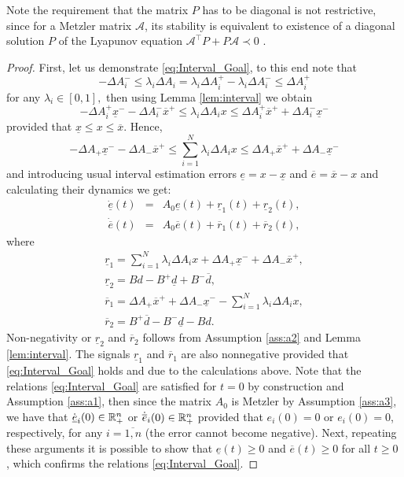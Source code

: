 \documentclass[twocolumn,english]{IEEEtran}
\theoremstyle{plain}
\theoremstyle{definition}
\theoremstyle{plain}
\theoremstyle{plain}
\theoremstyle{remark}
\begin{document}
Note the requirement that the matrix $P$ has to be diagonal is not restrictive, since for a Metzler matrix $\mathcal{A}$, its stability is equivalent to existence of a diagonal solution $P$ of the Lyapunov equation $\mathcal{A}^{\top}P+P\mathcal{A}\prec0$ \cite{FarinaRinaldi2000}.
\begin{proof}
First, let us demonstrate \eqref{eq:Interval_Goal}, to this end note that
\[
-\Delta A_{i}^{-}\leq\lambda_{i}\Delta A_{i}=\lambda_{i}\Delta A_{i}^{+}-\lambda_{i}\Delta A_{i}^{-}\leq\Delta A_{i}^{+}
\]
for any $\lambda_{i}\in[0,1],$ then using Lemma \ref{lem:interval} we obtain
\[
-\Delta A_{i}^{+}\underline{x}^{-}-\Delta A_{i}^{-}\overline{x}^{+}\leq\lambda_{i}\Delta A_{i}x\leq\Delta A_{i}^{+}\overline{x}^{+}+\Delta A_{i}^{-}\underline{x}^{-}
\]
provided that $\underline{x}\leq x\leq\overline{x}$. Hence,
\[
-\Delta A_{+}\underline{x}^{-}-\Delta A_{-}\overline{x}^{+}\leq\sum_{i=1}^{N}\lambda_{i}\Delta A_{i}x\leq\Delta A_{+}\overline{x}^{+}+\Delta A_{-}\underline{x}^{-}
\]
and introducing usual interval estimation errors $\underline{e}=x-\underline{x}$ and $\overline{e}=\overline{x}-x$ and calculating their dynamics we get:
\begin{eqnarray*}
\dot{\underline{e}}(t) & = & A_{0}\underline{e}(t)+\underline{r}_{1}(t)+\underline{r}_{2}(t),\\
\dot{\overline{e}}(t) & = & A_{0}\overline{e}(t)+\overline{r}_{1}(t)+\overline{r}_{2}(t),
\end{eqnarray*}
where
\begin{gather*}
\underline{r}_{1}=\sum_{i=1}^{N}\lambda_{i}\Delta A_{i}x+\Delta A_{+}\underline{x}^{-}+\Delta A_{-}\overline{x}^{+},\\
\underline{r}_{2}=Bd-B^{+}\underline{d}+B^{-}\overline{d},\\
\overline{r}_{1}=\Delta A_{+}\overline{x}^{+}+\Delta A_{-}\underline{x}^{-}-\sum_{i=1}^{N}\lambda_{i}\Delta A_{i}x,\\
\overline{r}_{2}=B^{+}\overline{d}-B^{-}\underline{d}-Bd.
\end{gather*}
Non-negativity or $\underline{r}_{2}$ and $\overline{r}_{2}$ follows from Assumption \ref{ass:a2} and Lemma \ref{lem:interval}. The signals $\underline{r}_{1}$ and $\overline{r}_{1}$ are also nonnegative provided that \eqref{eq:Interval_Goal} holds and due to the calculations above. Note that the relations \eqref{eq:Interval_Goal} are satisfied for $t=0$ by construction and Assumption \ref{ass:a1}, then since the matrix $A_{0}$ is Metzler by Assumption \ref{ass:a3}, we have that $\dot{\underline{e}}_{i}(0)\in\mathbb{R}_{+}^{n}$ or $\dot{\overline{e}}_{i}(0)\in\mathbb{R}_{+}^{n}$ provided that $e_{i}(0)=0$ or $e_{i}(0)=0$, respectively, for any $i=\overline{1,n}$ (the error cannot become negative). Next, repeating these arguments it is possible to show that $\underline{e}(t)\geq0$ and $\overline{e}(t)\geq0$ for all $t\geq0$ \cite{Smith95}, which confirms the relations \eqref{eq:Interval_Goal}.


\end{proof}
\end{document}
